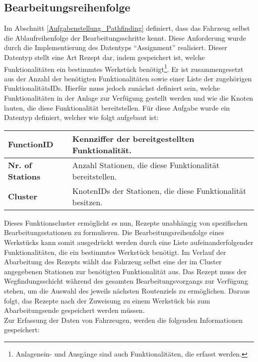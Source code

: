 		\subsection{Bearbeitungsreihenfolge}
		
			Im Abschnitt \ref{Aufgabenstellung_Pathfinding} definiert, dass das Fahrzeug selbst die Ablaufreihenfolge der Bearbeitungsschritte kennt. Diese Anforderung wurde durch die Implementierung des Datentyps "`Assignment"' realisiert. Dieser Datentyp stellt eine Art Rezept dar, indem gespeichert ist, welche Funktionalitäten ein bestimmtes Werkstück benötigt\footnote{Anlagenein- und Ausgänge sind auch Funktionalitäten, die erfasst werden.}. Er ist zusammengesetzt aus der Anzahl der benötigten Funktionalitäten sowie einer Liste der zugehörigen FunktionalitätsIDs. Hierfür muss jedoch zunächst definiert sein, welche Funktionalitäten in der Anlage zur Verfügung gestellt werden und wie die Knoten lauten, die diese Funktionalität bereitstellen. Für diese Aufgabe wurde ein Datentyp definiert, welcher wie folgt aufgebaut ist:
			
			\begin{longtable}{| l | l |}
				
				\hline
				\textbf{FunctionID} & Kennziffer der bereitgestellten Funktionalität.\\ \hline
				\textbf{Nr. of Stations} & Anzahl Stationen, die diese Funktionalität bereitstellen.\\ \hline
				\textbf{Cluster} & KnotenIDs der Stationen, die diese Funktionalität besitzen.\\
				\hline
				
			\end{longtable}
			
			Dieses Funktionscluster ermöglicht es nun, Rezepte unabhängig von spezifischen Bearbeitungsstationen zu formulieren. Die Bearbeitungsreihenfolge eines Werkstücks kann somit ausgedrückt werden durch eine Liste aufeinanderfolgender Funktionalitäten, die ein bestimmtes Werkstück benötigt. Im Verlauf der Abarbeitung des Rezepts wählt das Fahrzeug selbst eine der im Cluster angegebenen Stationen zur benötigten Funktionalität aus. Das Rezept muss der Wegfindungsschicht während des gesamten Bearbeitungsvorgangs zur Verfügung stehen, um die Auswahl des jeweils nächsten Routenziels zu ermöglichen. Daraus folgt, das Rezepte nach der Zuweisung zu einem Werkstück bis zum Abarbeitungsende gespeichert werden müssen.\\
			
			Zur Erfassung der Daten von Fahrzeugen, werden die folgenden Informationen gespeichert:
			
